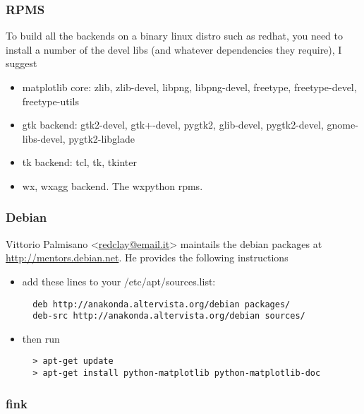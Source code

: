 \documentclass[twoside]{book}
\begin{document}
\subsubsection{RPMS}
\label{sec:rpms}

To build all the backends on a binary linux distro such as redhat, you
need to install a number of the devel libs (and whatever dependencies
they require), I suggest
\begin{itemize}
  
\item matplotlib core: zlib, zlib-devel, libpng, libpng-devel,
  freetype, freetype-devel, freetype-utils
  
\item gtk backend: gtk2-devel, gtk+-devel, pygtk2, glib-devel,
  pygtk2-devel, gnome-libs-devel, pygtk2-libglade

\item tk backend: tcl, tk, tkinter

\item wx, wxagg backend.  The wxpython rpms.
\end{itemize}

\subsubsection{Debian}
\label{sec:debian}

Vittorio Palmisano <\url{redclay@email.it}> maintails the debian
packages at \url{http://mentors.debian.net}.  He provides the
following instructions

\begin{itemize}
\item       add these lines to your /etc/apt/sources.list:
\begin{verbatim}
  deb http://anakonda.altervista.org/debian packages/
  deb-src http://anakonda.altervista.org/debian sources/
\end{verbatim}

\item then run

\begin{verbatim}
  > apt-get update
  > apt-get install python-matplotlib python-matplotlib-doc
\end{verbatim}
\end{itemize}

\subsubsection{fink}
\label{sec:fink}
\end{document}
